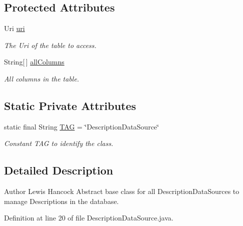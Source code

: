 \subsection*{Protected Attributes}
\begin{DoxyCompactItemize}
\item 
Uri \hyperlink{classuk_1_1ac_1_1swan_1_1digitaltrails_1_1database_1_1_description_data_source_ad5ab4f6ae6c94d72a77bd53a914aa8fa}{uri}
\begin{DoxyCompactList}\small\item\em The Uri of the table to access. \end{DoxyCompactList}\item 
String\mbox{[}$\,$\mbox{]} \hyperlink{classuk_1_1ac_1_1swan_1_1digitaltrails_1_1database_1_1_description_data_source_aa80b002da9e2cf4b83d25f13ca7843c0}{all\+Columns}
\begin{DoxyCompactList}\small\item\em All columns in the table. \end{DoxyCompactList}\end{DoxyCompactItemize}
\subsection*{Static Private Attributes}
\begin{DoxyCompactItemize}
\item 
static final String \hyperlink{classuk_1_1ac_1_1swan_1_1digitaltrails_1_1database_1_1_description_data_source_ac579097c3dcdd5818889b5332d888c85}{T\+A\+G} = \char`\"{}Description\+Data\+Source\char`\"{}
\begin{DoxyCompactList}\small\item\em Constant T\+A\+G to identify the class. \end{DoxyCompactList}\end{DoxyCompactItemize}


\subsection{Detailed Description}
\begin{DoxyAuthor}{Author}
Lewis Hancock Abstract base class for all Description\+Data\+Sources to manage Descriptions in the database. 
\end{DoxyAuthor}


Definition at line 20 of file Description\+Data\+Source.\+java.



